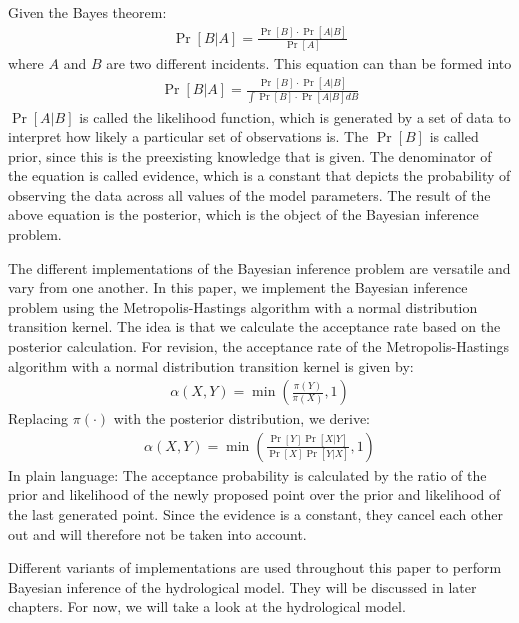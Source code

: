 Given the Bayes theorem:\cite{SatzBayes}
\begin{align}
    \Pr[B|A] = \frac{\Pr[B]\cdot\Pr[A|B]}{\Pr[A]}
\end{align}
where $A$ and $B$ are two different incidents. This equation can than be formed into
\begin{align}
    \Pr[B|A] = \frac{\Pr[B]\cdot\Pr[A|B]}{\int\Pr[B]\cdot\Pr[A|B]dB}
\end{align}
$\Pr[A|B]$ is called the likelihood function, which is generated by a set of data to interpret how likely a particular set of observations is.\cite{likelihood_idea} The $\Pr[B]$ is called prior, since this is the preexisting knowledge that is given.\cite{prior} The denominator of the equation is called evidence, which is a constant that depicts the probability of observing the data across all values of the model parameters.\cite{mcmc_practice} The result of the above equation is the posterior, which is the object of the Bayesian inference problem.\cite{mcmc_practice}

The different implementations of the Bayesian inference problem are versatile and vary from one another. In this paper, we implement the Bayesian inference problem using the Metropolis-Hastings algorithm with a normal distribution transition kernel. The idea is that we calculate the acceptance rate based on the posterior calculation. For revision, the acceptance rate of the Metropolis-Hastings algorithm with a normal distribution transition kernel is given by:\cite{mcmc_practice}
\begin{align}
    \alpha(X, Y) = \min (\frac{\pi(Y)}{\pi(X)}, 1)
\end{align}
Replacing $\pi(\cdot)$ with the posterior distribution, we derive:
\begin{align}
    \alpha(X, Y) = \min (\frac{\Pr[Y]\Pr[X|Y]}{\Pr[X]\Pr[Y|X]}, 1)
\end{align}
In plain language: The acceptance probability is calculated by the ratio of the prior and likelihood of the newly proposed point over the prior and likelihood of the last generated point. Since the evidence is a constant, they cancel each other out and will therefore not be taken into account.

Different variants of implementations are used throughout this paper to perform Bayesian inference of the hydrological model. They will be discussed in later chapters. For now, we will take a look at the hydrological model.





